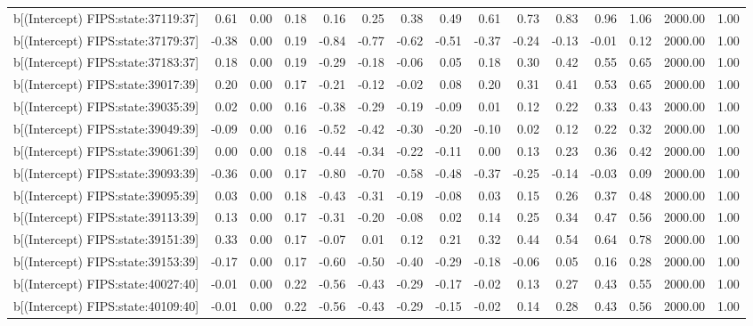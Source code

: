 \begin{table}[ht]
\begin{tabular}{rrrrrrrrrrrrrrr}
  b[(Intercept) FIPS:state:37119:37] & 0.61 & 0.00 & 0.18 & 0.16 & 0.25 & 0.38 & 0.49 & 0.61 & 0.73 & 0.83 & 0.96 & 1.06 & 2000.00 & 1.00 \\ 
  b[(Intercept) FIPS:state:37179:37] & -0.38 & 0.00 & 0.19 & -0.84 & -0.77 & -0.62 & -0.51 & -0.37 & -0.24 & -0.13 & -0.01 & 0.12 & 2000.00 & 1.00 \\ 
  b[(Intercept) FIPS:state:37183:37] & 0.18 & 0.00 & 0.19 & -0.29 & -0.18 & -0.06 & 0.05 & 0.18 & 0.30 & 0.42 & 0.55 & 0.65 & 2000.00 & 1.00 \\ 
  b[(Intercept) FIPS:state:39017:39] & 0.20 & 0.00 & 0.17 & -0.21 & -0.12 & -0.02 & 0.08 & 0.20 & 0.31 & 0.41 & 0.53 & 0.65 & 2000.00 & 1.00 \\ 
  b[(Intercept) FIPS:state:39035:39] & 0.02 & 0.00 & 0.16 & -0.38 & -0.29 & -0.19 & -0.09 & 0.01 & 0.12 & 0.22 & 0.33 & 0.43 & 2000.00 & 1.00 \\ 
  b[(Intercept) FIPS:state:39049:39] & -0.09 & 0.00 & 0.16 & -0.52 & -0.42 & -0.30 & -0.20 & -0.10 & 0.02 & 0.12 & 0.22 & 0.32 & 2000.00 & 1.00 \\ 
  b[(Intercept) FIPS:state:39061:39] & 0.00 & 0.00 & 0.18 & -0.44 & -0.34 & -0.22 & -0.11 & 0.00 & 0.13 & 0.23 & 0.36 & 0.42 & 2000.00 & 1.00 \\ 
  b[(Intercept) FIPS:state:39093:39] & -0.36 & 0.00 & 0.17 & -0.80 & -0.70 & -0.58 & -0.48 & -0.37 & -0.25 & -0.14 & -0.03 & 0.09 & 2000.00 & 1.00 \\ 
  b[(Intercept) FIPS:state:39095:39] & 0.03 & 0.00 & 0.18 & -0.43 & -0.31 & -0.19 & -0.08 & 0.03 & 0.15 & 0.26 & 0.37 & 0.48 & 2000.00 & 1.00 \\ 
  b[(Intercept) FIPS:state:39113:39] & 0.13 & 0.00 & 0.17 & -0.31 & -0.20 & -0.08 & 0.02 & 0.14 & 0.25 & 0.34 & 0.47 & 0.56 & 2000.00 & 1.00 \\ 
  b[(Intercept) FIPS:state:39151:39] & 0.33 & 0.00 & 0.17 & -0.07 & 0.01 & 0.12 & 0.21 & 0.32 & 0.44 & 0.54 & 0.64 & 0.78 & 2000.00 & 1.00 \\ 
  b[(Intercept) FIPS:state:39153:39] & -0.17 & 0.00 & 0.17 & -0.60 & -0.50 & -0.40 & -0.29 & -0.18 & -0.06 & 0.05 & 0.16 & 0.28 & 2000.00 & 1.00 \\ 
  b[(Intercept) FIPS:state:40027:40] & -0.01 & 0.00 & 0.22 & -0.56 & -0.43 & -0.29 & -0.17 & -0.02 & 0.13 & 0.27 & 0.43 & 0.55 & 2000.00 & 1.00 \\ 
  b[(Intercept) FIPS:state:40109:40] & -0.01 & 0.00 & 0.22 & -0.56 & -0.43 & -0.29 & -0.15 & -0.02 & 0.14 & 0.28 & 0.43 & 0.56 & 2000.00 & 1.00 \\ 

\end{tabular}
\end{table}
